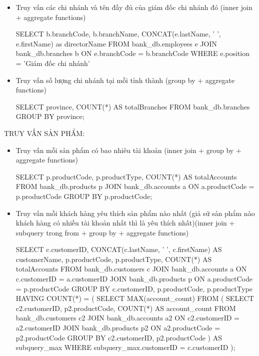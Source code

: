 \begin{itemize}
    \item Truy vấn các chi nhánh và tên đầy đủ của giám đốc chi nhánh đó (inner join + aggregate functions)
    \begin{MySQLCode}
    SELECT 
	b.branchCode,
        b.branchName,
        CONCAT(e.lastName, ' ', e.firstName) as directorName
    FROM 
        bank_db.employees e
    JOIN 
        bank_db.branches b ON e.branchCode = b.branchCode
    WHERE
    	e.position = 'Giám đốc chi nhánh'
    \end{MySQLCode}

    \item Truy vấn số lượng chi nhánh tại mỗi tỉnh thành (group by + aggregate functions)
    \begin{MySQLCode}
    SELECT 
	province,
        COUNT(*) AS totalBranches
    FROM 
        bank_db.branches
    GROUP BY 
        province;
    \end{MySQLCode}

\end{itemize}
TRUY VẤN SẢN PHẨM:
\begin{itemize}

    \item Truy vấn mỗi sản phẩm có bao nhiêu tài khoản (inner join + group by + aggregate functions)
    \begin{MySQLCode}
    SELECT
	p.productCode,
        p.productType,
        COUNT(*) AS totalAccounts
    FROM 
	bank_db.products p
    JOIN
	bank_db.accounts a ON a.productCode = p.productCode
    GROUP BY
	p.productCode;
    \end{MySQLCode}

    \item Truy vấn mỗi khách hàng yêu thích sản phẩm nào nhất (giả sử sản phẩm nào khách hàng có nhiều tài khoản nhất thì là yêu thích nhất)(inner join + subquery trong from + group by + aggregate functions)
    \begin{MySQLCode}
    SELECT
        c.customerID,
        CONCAT(c.lastName, ' ', c.firstName) AS customerName,
        p.productCode,
        p.productType,
        COUNT(*) AS totalAccounts
    FROM
        bank_db.customers c
    JOIN 
        bank_db.accounts a ON c.customerID = a.customerID
    JOIN 
        bank_db.products p ON a.productCode = p.productCode
    GROUP BY
        c.customerID,
        p.productCode,
        p.productType
    HAVING
        COUNT(*) = (
            SELECT 
                MAX(account_count)
            FROM (
                SELECT 
                    c2.customerID,
                    p2.productCode,
                    COUNT(*) AS account_count
                FROM
                    bank_db.customers c2
                JOIN 
                    bank_db.accounts a2 ON c2.customerID = a2.customerID
                JOIN 
                    bank_db.products p2 ON a2.productCode = p2.productCode
                GROUP BY
                    c2.customerID,
                    p2.productCode
            ) AS subquery_max
            WHERE subquery_max.customerID = c.customerID
        );
    \end{MySQLCode}

\end{itemize}

    
    

    

